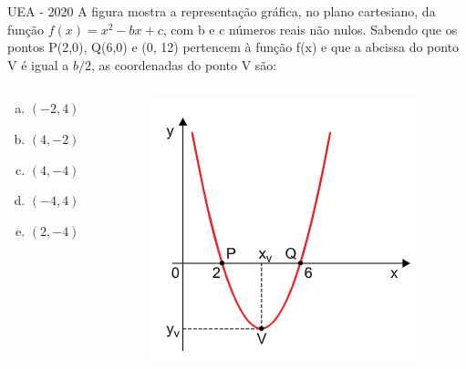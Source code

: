 \documentclass[11pt]{beamer}
\begin{document}
\begin{frame}{UEA - 2020}
    A figura mostra a representação gráfica, no plano cartesiano, da função $f(x) = x^{2}- bx+c$, com b e c números reais não nulos. Sabendo que os pontos P(2,0), Q(6,0) e (0, 12) pertencem à função f(x) e que a abcissa do ponto V é igual a ${b}/{2}$, as coordenadas do ponto V são:

    \begin{columns}
        \begin{column}{0.4\textwidth}
            \begin{enumerate}[a)]
                \item $(-2,4)$ 
                \item $(4,-2)$
                \item $(4,-4)$ %
                \item $(-4,4)$
                \item $(2,-4)$
            \end{enumerate}
        \end{column}

        \begin{column}{0.5\textwidth}
            \centering
            \includegraphics[width=0.8\linewidth]{imagens/uea-macro-2020.png}
        \end{column}
    \end{columns}
\end{frame}
\end{document}
